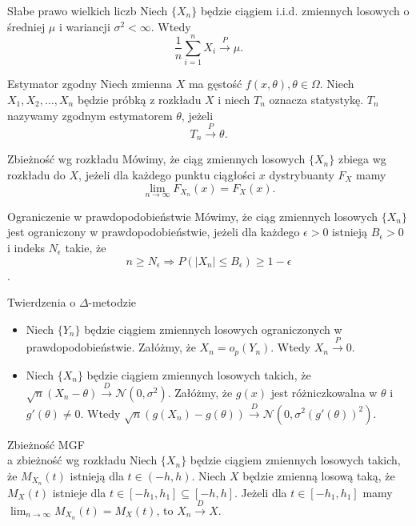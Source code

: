 \documentclass[avery5371, grid, frame]{flashcards}
\begin{document}
\begin{flashcard}[Twierdzenie]{Słabe prawo wielkich liczb}
    Niech $\{X_n\}$ będzie ciągiem i.i.d. zmiennych losowych o średniej $\mu$ i wariancji $\sigma^2 < \infty$. Wtedy $$ \frac{1}{n} \sum_{i=1}^{n} X_i \xrightarrow{P} \mu.$$
\end{flashcard}

\begin{flashcard}[Definicja]{Estymator zgodny}
    Niech zmienna $X$ ma gęstość $f(x, \theta), \theta \in \Omega$. Niech $X_1, X_2, \dots, X_n$ będzie próbką z rozkładu $X$ i niech $T_n$ oznacza statystykę. $T_n$ nazywamy zgodnym estymatorem $\theta$, jeżeli $$ T_n \xrightarrow{P} \theta . $$
\end{flashcard}

\begin{flashcard}[Definicja]{Zbieżność wg rozkładu}
     Mówimy, że ciąg zmiennych losowych $\{ X_n \}$ zbiega wg rozkładu do $X$, jeżeli dla każdego punktu ciągłości $x$ dystrybuanty $F_X$ mamy $$ \lim_{n \rightarrow \infty} F_{X_n}(x) = F_X(x).$$
\end{flashcard}

\begin{flashcard}[Definicja]{Ograniczenie w prawdopodobieństwie}
    Mówimy, że ciąg zmiennych losowych $\{ X_n \}$ jest ograniczony w prawdopodobieństwie, jeżeli dla każdego $\epsilon > 0$ istnieją $B_\epsilon > 0$ i indeks $N_\epsilon$ takie, że $$ n \geq N_\epsilon \Rightarrow P(|X_n| \leq B_\epsilon) \geq 1-\epsilon$$.
\end{flashcard}

\begin{flashcard}[Twierdzenie]{Twierdzenia o $\Delta$-metodzie}
    \begin{itemize}
        \item Niech $\{Y_n\}$ będzie ciągiem zmiennych losowych ograniczonych w prawdopodobieństwie. Załóżmy, że $X_n = o_p(Y_n)$. Wtedy $X_n \xrightarrow{P} 0$.
        \item Niech $\{X_n\}$ będzie ciągiem zmiennych losowych takich, że $ \sqrt{n}(X_n - \theta) \xrightarrow{D} \mathcal{N}(0, \sigma^2).$ Załóżmy, że $g(x)$ jest różniczkowalna w $\theta$ i $g'(\theta) \neq 0.$ Wtedy $\sqrt{n}(g(X_n) - g(\theta)) \xrightarrow{D} \mathcal{N}(0, \sigma^2(g'(\theta))^2)$.
    \end{itemize}
\end{flashcard}

\begin{flashcard}[Twierdzenie]{Zbieżność MGF \\ a zbieżność wg rozkładu}
    Niech $\{X_n\}$ będzie ciągiem zmiennych losowych takich, że $M_{X_n}(t)$ istnieją dla $t \in (-h, h)$. Niech $X$ będzie zmienną losową taką, że $M_X(t)$ istnieje dla $t \in [-h_1, h_1] \subseteq [-h, h]$. Jeżeli dla $t \in [-h_1, h_1]$ mamy $\lim_{n \rightarrow \infty} M_{X_n}(t) = M_X(t)$, to $X_n \xrightarrow{D} X$.
\end{flashcard}
\end{document}
